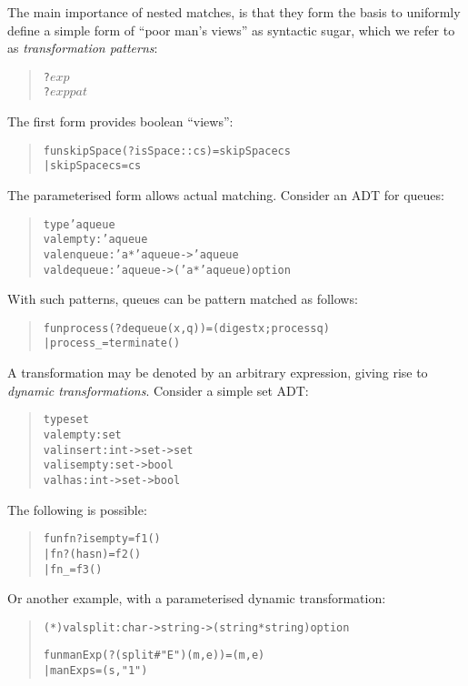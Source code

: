 \documentclass[twoside,titlepage]{article}
\begin{document}
\begin{appendix}
The main importance of nested matches, is that they form the basis to uniformly define a simple form of ``poor man's views'' as syntactic sugar, which we refer to as \emph{transformation patterns}:
\begin{quote}
\begin{alltt}
?\(\mathit{exp}\)
?\(\mathit{exp}\) \(\mathit{pat}\)
\end{alltt}
\end{quote}
The first form provides boolean ``views'':
\begin{quote}
\begin{alltt}
fun skipSpace(?isSpace :: cs) = skipSpace cs
  | skipSpace cs = cs
\end{alltt}
\end{quote}
The parameterised form allows actual matching. Consider an ADT for queues:
\begin{quote}
\begin{alltt}
type 'a queue
val empty : 'a queue
val enqueue : 'a * 'a queue -> 'a queue
val dequeue : 'a queue -> ('a * 'a queue) option
\end{alltt}
\end{quote}
With such patterns, queues can be pattern matched as follows:
\begin{quote}
\begin{alltt}
fun process (?dequeue(x,q)) = (digest x; process q)
  | process _ = terminate()
\end{alltt}
\end{quote}
A transformation may be denoted by an arbitrary expression, giving rise to \emph{dynamic transformations}. Consider a simple set ADT:
\begin{quote}
\begin{alltt}
type set
val empty : set
val insert : int -> set -> set
val isempty : set -> bool
val has : int -> set -> bool
\end{alltt}
\end{quote}
The following is possible:
\begin{quote}
\begin{alltt}
fun f n ?isempty = f1 ()
  | f n ?(has n) = f2 ()
  | f n _ = f3 ()
\end{alltt}
\end{quote}
Or another example, with a parameterised dynamic transformation:
\begin{quote}
\begin{alltt}
(*) val split : char -> string -> (string * string) option

fun manExp(?(split #"E")(m,e)) = (m,e)
  | manExp s = (s,"1")
\end{alltt}
\end{quote}


\end{appendix}
\end{document}
